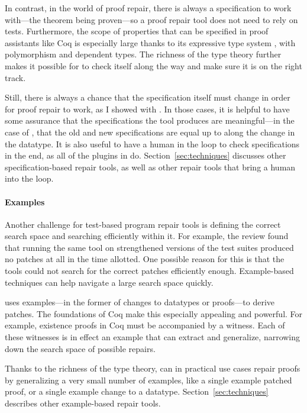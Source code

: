 In contrast, in the world of proof repair, there is always a specification to work with---the theorem being proven---so
a proof repair tool does not need to rely on tests.
Furthermore, the scope of properties that can be specified in proof assistants like Coq is especially large thanks to its expressive type system ,
with polymorphism and dependent types.
The richness of the type theory further makes it possible for \sysnamelong to check itself along the way and make sure it is on the right track.

Still, there is always a chance that the specification itself must change in order for proof repair to work,
as I showed with \toolnamec.
In those cases, it is helpful to have some assurance that the specifications the tool produces are meaningful---in the case of
\toolnamec, that the old and new specifications are equal up to  along the change in the datatype.
It is also useful to have a human in the loop to check specifications in the end,
as all of the plugins in \sysnamelong do.
Section~\ref{sec:techniques} discusses other specification-based repair tools,
as well as other repair tools that bring a human into the loop.

\paragraph{Examples}
Another challenge for test-based program repair tools is defining the correct search space and searching efficiently within it.
For example, the review found that running the same tool on strengthened versions of the test suites produced no patches at all in the time allotted.
One possible reason for this is that the tools could not search for the correct patches efficiently enough.
Example-based techniques can help navigate a large search space quickly.

\sysnamelong uses examples---in the former of changes to datatypes or proofs---to derive patches.
The  foundations of Coq make this especially appealing and powerful.
For example, existence proofs in Coq must be accompanied by a witness.
Each of these witnesses is in effect an example that \sysnamelong can extract and generalize,
narrowing down the search space of possible repairs.

Thanks to the richness of the type theory, \sysnamelong can in practical use cases repair proofs by generalizing a very small number of examples,
like a single example patched proof, or a single example change to a datatype.
Section~\ref{sec:techniques} describes other example-based repair tools.


